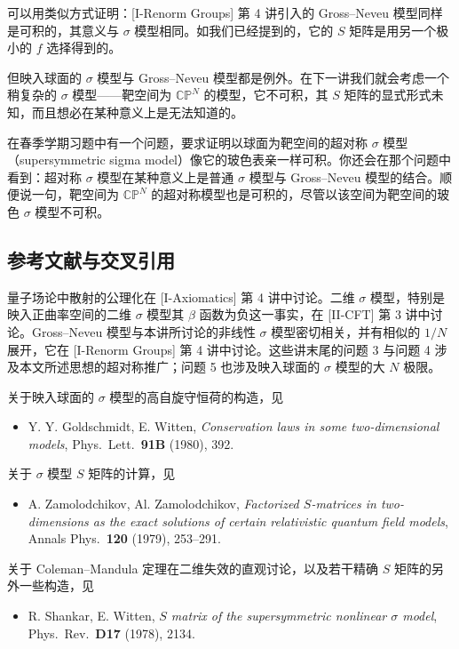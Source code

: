 可以用类似方式证明：[I-Renorm Groups] 第 4 讲引入的 Gross–Neveu 模型同样是可积的，其意义与 $\sigma$ 模型相同。如我们已经提到的，它的 $S$ 矩阵是用另一个极小的 $f$ 选择得到的。

但映入球面的 $\sigma$ 模型与 Gross–Neveu 模型都是例外。在下一讲我们就会考虑一个稍复杂的 $\sigma$ 模型——靶空间为 $\mathbb{CP}^N$ 的模型，它不可积，其 $S$ 矩阵的显式形式未知，而且想必在某种意义上是无法知道的。

在春季学期习题中有一个问题，要求证明以球面为靶空间的超对称 $\sigma$ 模型（supersymmetric sigma model）像它的玻色表亲一样可积。你还会在那个问题中看到：超对称 $\sigma$ 模型在某种意义上是普通 $\sigma$ 模型与 Gross–Neveu 模型的结合。顺便说一句，靶空间为 $\mathbb{CP}^N$ 的超对称模型也是可积的，尽管以该空间为靶空间的玻色 $\sigma$ 模型不可积。

\subsection{参考文献与交叉引用}

量子场论中散射的公理化在 [I-Axiomatics] 第 4 讲中讨论。二维 $\sigma$ 模型，特别是映入正曲率空间的二维 $\sigma$ 模型其 $\beta$ 函数为负这一事实，在 [II-CFT] 第 3 讲中讨论。Gross–Neveu 模型与本讲所讨论的非线性 $\sigma$ 模型密切相关，并有相似的 $1/N$ 展开，它在 [I-Renorm Groups] 第 4 讲中讨论。这些讲末尾的问题 3 与问题 4 涉及本文所述思想的超对称推广；问题 5 也涉及映入球面的 $\sigma$ 模型的大 $N$ 极限。

关于映入球面的 $\sigma$ 模型的高自旋守恒荷的构造，见
\begin{itemize}
  \item[] Y. Y. Goldschmidt, E. Witten, \textit{Conservation laws in some two-dimensional models}, Phys.\ Lett.\ \textbf{91B} (1980), 392.
\end{itemize}

关于 $\sigma$ 模型 $S$ 矩阵的计算，见
\begin{itemize}
  \item[] A. Zamolodchikov, Al. Zamolodchikov, \textit{Factorized $S$-matrices in two-dimensions as the exact solutions of certain relativistic quantum field models}, Annals Phys.\ \textbf{120} (1979), 253--291.
\end{itemize}

关于 Coleman–Mandula 定理在二维失效的直观讨论，以及若干精确 $S$ 矩阵的另外一些构造，见
\begin{itemize}
  \item[] R. Shankar, E. Witten, \textit{$S$ matrix of the supersymmetric nonlinear $\sigma$ model}, Phys.\ Rev.\ \textbf{D17} (1978), 2134.
\end{itemize}

